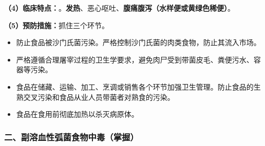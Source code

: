 \begin{keybox}
\textbf{（4）临床特点：}。\textbf{发热}、恶心呕吐、\textbf{腹痛腹泻（水样便或黄绿色稀便）}。

\textbf{（5）预防措施：}抓住三个环节。
\begin{itemize}[leftmargin=*]
    \item 防止食品被沙门氏菌污染。严格控制沙门氏菌的肉类食物，防止其流入市场。
    \item 严格遵循合理屠宰过程的卫生学要求，避免肉尸受到带菌皮毛、粪便污水、容器等污染。
    \item 食品在储藏、运输、加工、烹调或销售各个环节加强卫生管理。防止食品的生熟交叉污染和食品从业人员带菌者对熟食的污染。
    \item 食品在食用前彻底加热以杀灭病原体。
\end{itemize}
\end{keybox}

\subsubsection{二、副溶血性弧菌食物中毒（掌握）}

